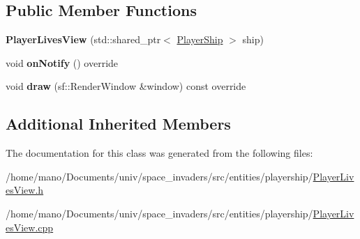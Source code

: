 \subsection*{Public Member Functions}
\begin{DoxyCompactItemize}
\item 
\mbox{\label{classentities_1_1playership_1_1PlayerLivesView_a3641cc3d57cd2d39c239ccf55bbf753b}} 
{\bfseries Player\+Lives\+View} (std\+::shared\+\_\+ptr$<$ \hyperlink{classentities_1_1playership_1_1PlayerShip}{Player\+Ship} $>$ ship)
\item 
\mbox{\label{classentities_1_1playership_1_1PlayerLivesView_acb60896fe7d67a869173161c3df8221c}} 
void {\bfseries on\+Notify} () override
\item 
\mbox{\label{classentities_1_1playership_1_1PlayerLivesView_afda45f04f11cb8e76b9de1595b0feceb}} 
void {\bfseries draw} (sf\+::\+Render\+Window \&window) const override
\end{DoxyCompactItemize}
\subsection*{Additional Inherited Members}


The documentation for this class was generated from the following files\+:\begin{DoxyCompactItemize}
\item 
/home/mano/\+Documents/univ/space\+\_\+invaders/src/entities/playership/\hyperlink{PlayerLivesView_8h}{Player\+Lives\+View.\+h}\item 
/home/mano/\+Documents/univ/space\+\_\+invaders/src/entities/playership/\hyperlink{PlayerLivesView_8cpp}{Player\+Lives\+View.\+cpp}\end{DoxyCompactItemize}
